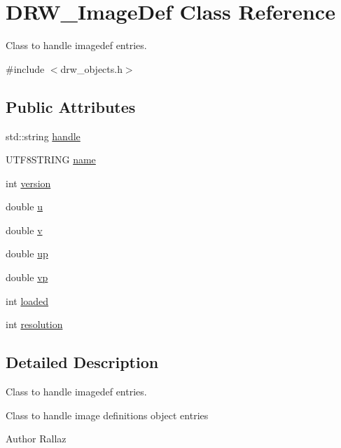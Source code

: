\hypertarget{class_d_r_w___image_def}{}\section{D\+R\+W\+\_\+\+Image\+Def Class Reference}
\label{class_d_r_w___image_def}


Class to handle imagedef entries.  




{\ttfamily \#include $<$drw\+\_\+objects.\+h$>$}

\subsection*{Public Attributes}
\begin{DoxyCompactItemize}
\item 
std\+::string \hyperlink{class_d_r_w___image_def_a517f8cad9dd36a640779f3f1ed9600f7}{handle}
\item 
U\+T\+F8\+S\+T\+R\+I\+N\+G \hyperlink{class_d_r_w___image_def_abd0cb813e416eba0b541beb90ba8a1c4}{name}
\item 
int \hyperlink{class_d_r_w___image_def_a2f47b0e3ad2e33f750bbe97d3e30ceaf}{version}
\item 
double \hyperlink{class_d_r_w___image_def_afe11ccfebf55c9ec07a92cda8f09d98c}{u}
\item 
double \hyperlink{class_d_r_w___image_def_a25c16e07b7d0887cf71f4d276b58217c}{v}
\item 
double \hyperlink{class_d_r_w___image_def_ad33a25f477e0448bae9a74fc902efafc}{up}
\item 
double \hyperlink{class_d_r_w___image_def_a95e92947b72818845b6cd9fe0c9add8a}{vp}
\item 
int \hyperlink{class_d_r_w___image_def_a2265a01592e1b25b1a4c6294423f76f6}{loaded}
\item 
int \hyperlink{class_d_r_w___image_def_a4bc6163d679744d2f58c00cb5d6573b0}{resolution}
\end{DoxyCompactItemize}


\subsection{Detailed Description}
Class to handle imagedef entries. 

Class to handle image definitions object entries \begin{DoxyAuthor}{Author}
Rallaz 
\end{DoxyAuthor}


